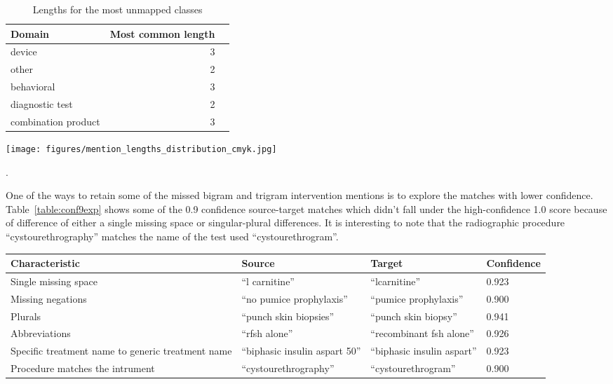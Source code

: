 \documentclass[letterpaper]{article} %
\begin{document}
%
\begin{table}[!htbp]
\centering
\begin{tabular}{lrl}
\hline \textbf{Domain} & \textbf{ Most common length } \\ \hline
device & 3 \\
other & 2 \\
behavioral & 3 \\
diagnostic test & 2 \\
combination product & 3 \\
\hline
\end{tabular}
\caption{Lengths for the most unmapped classes}
\label{table:len_unmapped_classes} 
\end{table}
%
%
%
\begin{figure*}[hbt!]
\centering
\texttt{[image: figures/mention\_lengths\_distribution\_cmyk.jpg]}
\caption{Left) Phrase length distribution of mapped intervention mentions, Right) Phrase length distribution of unmapped intervention mentions.}.
\label{app:length_mappedunmapped}
\end{figure*}
%
%
%


One of the ways to retain some of the missed bigram and trigram intervention mentions is to explore the matches with lower confidence.
Table~\ref{table:conf9exp} shows some of the 0.9 confidence source-target matches which didn't fall under the high-confidence 1.0 score because of difference of either a single missing space or singular-plural differences.
It is interesting to note that the radiographic procedure ``cystourethrography'' matches the name of the test used ``cystourethrogram''.
%
\begin{table*}
\begin{center}
    \begin{tabular}{p{5cm}p{4cm}p{4cm}p{2cm}}
    \hline \textbf{Characteristic} & \textbf{Source} & \textbf{Target} & \textbf{Confidence} \\ \hline
    Single missing space & ``l carnitine'' & ``lcarnitine'' & 0.923\\
    Missing negations & ``no pumice prophylaxis''&  ``pumice prophylaxis''  & 0.900\\
    Plurals & ``punch skin biopsies'' &  ``punch skin biopsy''  & 0.941\\
    Abbreviations & ``rfsh alone'' & ``recombinant fsh alone'' & 0.926\\
    Specific treatment name to generic treatment name & ``biphasic insulin aspart 50'' & ``biphasic insulin aspart'' & 0.923\\
    Procedure matches the intrument & ``cystourethrography'' & ``cystourethrogram'' & 0.900\\
    \hline
    \end{tabular}
\end{center}
\caption{Example ``Intervention'' mentions from CTO that get mapped to target sentences $t$ with a $d_{s}$ of 0.9}
\label{table:conf9exp} 
\end{table*} 
%
%
%
\end{document}
